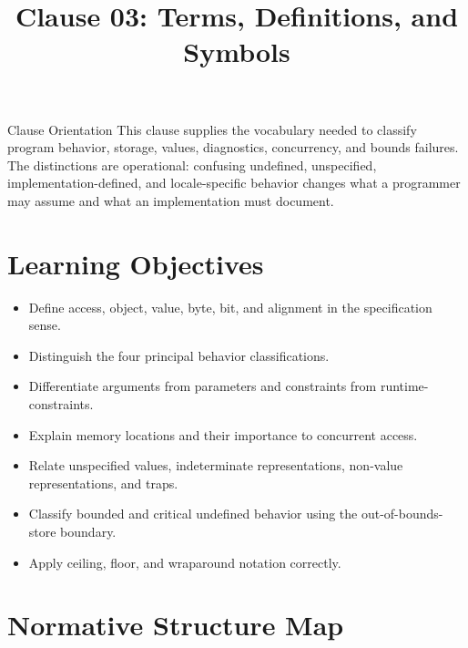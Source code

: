\documentclass[10pt,letterpaper]{article}
\title{Clause 03: Terms, Definitions, and Symbols}
\author{}
\date{}
\begin{document}
\maketitle



\begin{CornellOverviewBox}{Clause Orientation}
This clause supplies the vocabulary needed to classify program behavior, storage, values, diagnostics, concurrency, and bounds failures. The distinctions are operational: confusing undefined, unspecified, implementation-defined, and locale-specific behavior changes what a programmer may assume and what an implementation must document.
\end{CornellOverviewBox}

\section{Learning Objectives}
\begin{itemize}
  \item Define access, object, value, byte, bit, and alignment in the specification sense.
  \item Distinguish the four principal behavior classifications.
  \item Differentiate arguments from parameters and constraints from runtime-constraints.
  \item Explain memory locations and their importance to concurrent access.
  \item Relate unspecified values, indeterminate representations, non-value representations, and traps.
  \item Classify bounded and critical undefined behavior using the out-of-bounds-store boundary.
  \item Apply ceiling, floor, and wraparound notation correctly.
\end{itemize}

\section{Normative Structure Map}
\begin{CornellNotesTable}
\end{CornellNotesTable}
\end{document}
